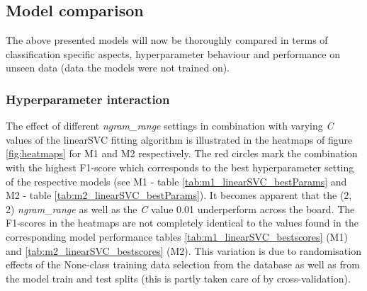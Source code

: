 \subsection{Model comparison}
The above presented models will now be thoroughly compared in terms of classification specific aspects, hyperparameter behaviour and performance on unseen data (data the models were not trained on). 

\subsubsection{Hyperparameter interaction}
The effect of different \textit{ngram\_range} settings in combination with varying \textit{C} values of the linearSVC fitting algorithm is illustrated in the heatmaps of figure \ref{fig:heatmaps} for M1 and M2 respectively. The red circles mark the combination with the highest F1-score which corresponds to the best hyperparameter setting of the respective models (see M1 - table \ref{tab:m1_linearSVC_bestParams} and M2 - table \ref{tab:m2_linearSVC_bestParams}). It becomes apparent that the (2, 2) \textit{ngram\_range} as well as the \textit{C} value 0.01 underperform across the board. The F1-scores in the heatmaps are not completely identical to the values found in the corresponding model performance tables \ref{tab:m1_linearSVC_bestscores} (M1) and \ref{tab:m2_linearSVC_bestscores} (M2). This variation is due to randomisation effects of the None-class training data selection from the database as well as from the model train and test splits (this is partly taken care of by cross-validation).\\

